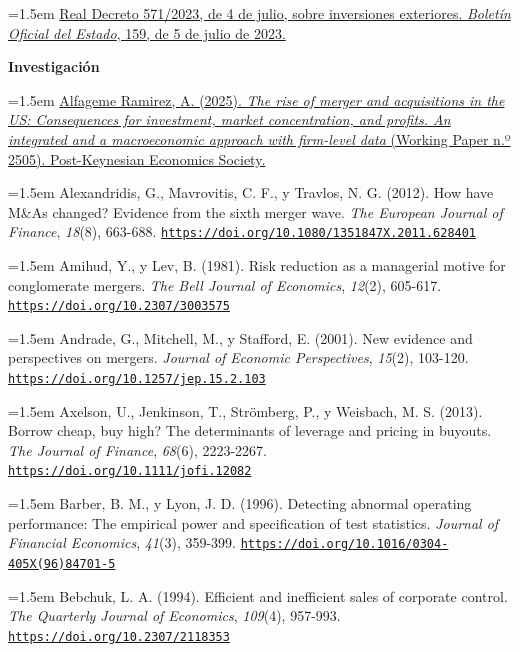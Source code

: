 \documentclass[10pt,a4paper]{article}
\begin{document}
\noindent\hangindent=1.5em \href{https://www.boe.es/eli/es/rd/2023/07/04/571/con}{Real Decreto 571/2023, de 4 de julio, sobre inversiones exteriores. \textit{Boletín Oficial del Estado}, 159, de 5 de julio de 2023.}

\textbf{Investigación}

\noindent\hangindent=1.5em \href{https://postkeynesian.net/media/working-papers/PKWP2505.pdf}{Alfageme Ramirez, A. (2025). \textit{The rise of merger and acquisitions in the US: Consequences for investment, market concentration, and profits. An integrated and a macroeconomic approach with firm-level data} (Working Paper n.º 2505). Post-Keynesian Economics Society.}

\noindent\hangindent=1.5em Alexandridis, G., Mavrovitis, C. F., y Travlos, N. G. (2012). How have M\&As changed? Evidence from the sixth merger wave. \textit{The European Journal of Finance}, \textit{18}(8), 663-688. \href{https://doi.org/10.1080/1351847X.2011.628401}{\nolinkurl{https://doi.org/10.1080/1351847X.2011.628401}}

\noindent\hangindent=1.5em Amihud, Y., y Lev, B. (1981). Risk reduction as a managerial motive for conglomerate mergers. \textit{The Bell Journal of Economics}, \textit{12}(2), 605-617. \href{https://doi.org/10.2307/3003575}{\nolinkurl{https://doi.org/10.2307/3003575}}

\noindent\hangindent=1.5em Andrade, G., Mitchell, M., y Stafford, E. (2001). New evidence and perspectives on mergers. \textit{Journal of Economic Perspectives}, \textit{15}(2), 103-120. \href{https://doi.org/10.1257/jep.15.2.103}{\nolinkurl{https://doi.org/10.1257/jep.15.2.103}}

\noindent\hangindent=1.5em Axelson, U., Jenkinson, T., Strömberg, P., y Weisbach, M. S. (2013). Borrow cheap, buy high? The determinants of leverage and pricing in buyouts. \textit{The Journal of Finance}, \textit{68}(6), 2223-2267. \href{https://doi.org/10.1111/jofi.12082}{\nolinkurl{https://doi.org/10.1111/jofi.12082}}

\noindent\hangindent=1.5em Barber, B. M., y Lyon, J. D. (1996). Detecting abnormal operating performance: The empirical power and specification of test statistics. \textit{Journal of Financial Economics}, \textit{41}(3), 359-399. \href{https://doi.org/10.1016/0304-405X(96)84701-5}{\nolinkurl{https://doi.org/10.1016/0304-405X(96)84701-5}}

\noindent\hangindent=1.5em Bebchuk, L. A. (1994). Efficient and inefficient sales of corporate control. \textit{The Quarterly Journal of Economics}, \textit{109}(4), 957-993. \href{https://doi.org/10.2307/2118353}{\nolinkurl{https://doi.org/10.2307/2118353}}
\end{document}
